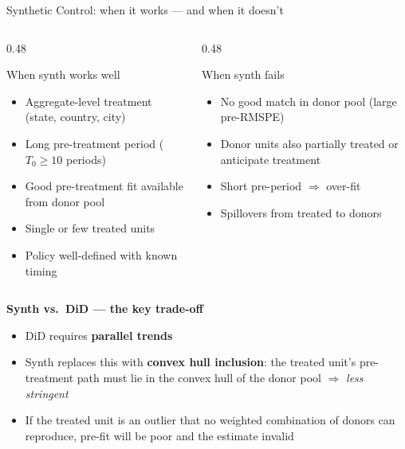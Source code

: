 \documentclass[aspectratio=169, 10pt]{beamer}
\begin{document}
\begin{frame}[shrink=5]{Synthetic Control: when it works — and when it doesn't}

  \begin{columns}[T]
    \begin{column}{0.48\textwidth}
      \begin{block}{When synth works well}
        \begin{itemize}
          \item Aggregate-level treatment (state, country, city)
          \item Long pre-treatment period ($T_0 \geq 10$ periods)
          \item Good pre-treatment fit available from donor pool
          \item Single or few treated units
          \item Policy well-defined with known timing
        \end{itemize}
      \end{block}
    \end{column}
    \begin{column}{0.48\textwidth}
      \begin{alertblock}{When synth fails}
        \begin{itemize}
          \item No good match in donor pool (large pre-RMSPE)
          \item Donor units also partially treated or anticipate treatment
          \item Short pre-period $\Rightarrow$ over-fit
          \item Spillovers from treated to donors
        \end{itemize}
      \end{alertblock}
    \end{column}
  \end{columns}

  \medskip
      \textbf{Synth vs.\ DiD — the key trade-off}
      \begin{itemize}\small
        \item DiD requires \textbf{parallel trends}
        \item Synth replaces this with \textbf{convex hull inclusion}:
              the treated unit's pre-treatment path must lie in the
              convex hull of the donor pool $\Rightarrow$ \emph{less stringent}
        \item If the treated unit is an outlier that no weighted
              combination of donors can reproduce, pre-fit will be
              poor and the estimate invalid
      \end{itemize}


\end{frame}
\end{document}
